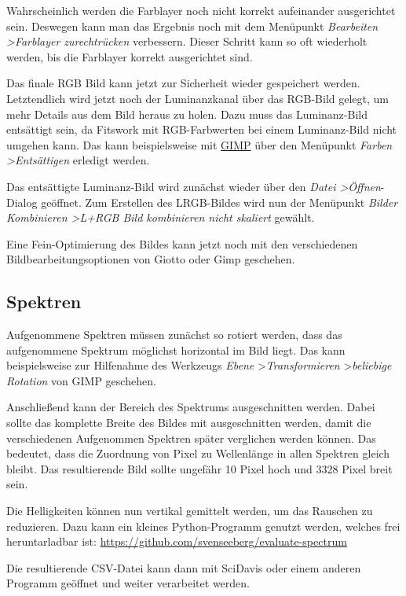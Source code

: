 \documentclass[10pt,a4paper,titlepage]{article}
\begin{document}
Wahrscheinlich werden die Farblayer noch nicht korrekt aufeinander ausgerichtet sein. Deswegen kann man das Ergebnis noch mit dem Menüpunkt \textit{Bearbeiten \textgreater Farblayer zurechtrücken} verbessern. Dieser Schritt kann so oft wiederholt werden, bis die Farblayer korrekt ausgerichtet sind.

Das finale RGB Bild kann jetzt zur Sicherheit wieder gespeichert werden. Letztendlich wird jetzt noch der Luminanzkanal über das RGB-Bild gelegt, um mehr Details aus dem Bild heraus zu holen. Dazu muss das Luminanz-Bild entsättigt sein, da Fitswork mit RGB-Farbwerten bei einem Luminanz-Bild nicht umgehen kann. Das kann beispielsweise mit \href{http://gimp.org}{GIMP} über den Menüpunkt \textit{Farben \textgreater Entsättigen} erledigt werden.

Das entsättigte Luminanz-Bild wird zunächst wieder über den \textit{Datei \textgreater Öffnen}-Dialog geöffnet. Zum Erstellen des LRGB-Bildes wird nun der Menüpunkt \textit{Bilder Kombinieren \textgreater L+RGB Bild kombinieren nicht skaliert} gewählt.

Eine Fein-Optimierung des Bildes kann jetzt noch mit den verschiedenen Bildbearbeitungsoptionen von Giotto oder Gimp geschehen.

\subsection{Spektren}
Aufgenommene Spektren müssen zunächst so rotiert werden, dass das aufgenommene Spektrum möglichst horizontal im Bild liegt. Das kann beispielsweise zur Hilfenahme des Werkzeugs \textit{Ebene} \textgreater \textit{Transformieren} \textgreater \textit{beliebige Rotation} von GIMP geschehen.

Anschließend kann der Bereich des Spektrums ausgeschnitten werden. Dabei sollte das komplette Breite des Bildes mit ausgeschnitten werden, damit die verschiedenen Aufgenommen Spektren später verglichen werden können. Das bedeutet, dass die Zuordnung von Pixel zu Wellenlänge in allen Spektren gleich bleibt. Das resultierende Bild sollte ungefähr 10 Pixel hoch und 3328 Pixel breit sein.

Die Helligkeiten können nun vertikal gemittelt werden, um das Rauschen zu reduzieren. Dazu kann ein kleines Python-Programm genutzt werden, welches frei heruntarladbar ist: \href{https://github.com/svenseeberg/evaluate-spectrum}{https://github.com/svenseeberg/evaluate-spectrum}

Die resultierende CSV-Datei kann dann mit SciDavis oder einem anderen Programm geöffnet und weiter verarbeitet werden.
\end{document}

